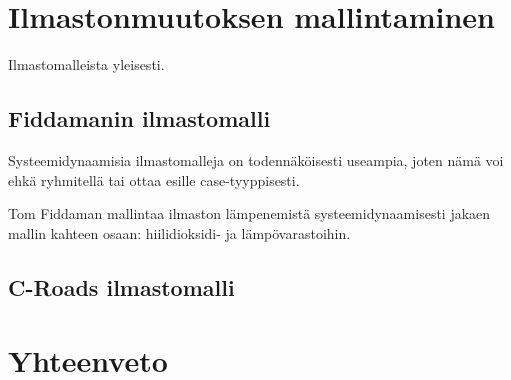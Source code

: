 \documentclass[finnish,12pt,a4paper,pdftex]{article}
\begin{document}
\begin{onehalfspacing}
\clearpage
\section{Ilmastonmuutoksen mallintaminen}
Ilmastomalleista yleisesti.

\subsection{Fiddamanin ilmastomalli}
Systeemidynaamisia ilmastomalleja on todennäköisesti useampia, joten nämä voi ehkä ryhmitellä tai ottaa esille case-tyyppisesti. 

Tom Fiddaman mallintaa ilmaston lämpenemistä systeemidynaamisesti jakaen mallin kahteen osaan: hiilidioksidi- ja lämpövarastoihin. 

\subsection{C-Roads ilmastomalli}


\clearpage




\section{Yhteenveto}

\clearpage

{}



\end{onehalfspacing} %
\end{document}
